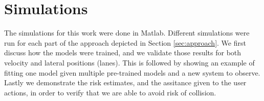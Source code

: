 \documentclass[letterpaper, 10 pt, conference]{ieeeconf}  %
\newcommand\RP[1]{$\clubsuit$\footnote{RP: #1}}
\begin{document}



\section{Simulations} \label{sec:sims}
The simulations for this work were done in Matlab. Different simulations were run for each part of the approach depicted in Section \ref{sec:approach}. We first discuss how the models were trained, and we validate those results for both velocity and lateral positions (lanes). This is followed by showing an example of fitting one model given multiple pre-trained models and a new system to observe. Lastly we demonstrate the risk estimates, and the assitance given to the user actions, in order to verify that we are able to avoid risk of collision.
\end{document}
